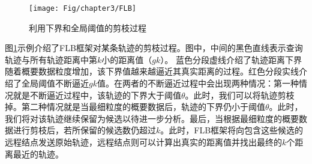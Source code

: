 \begin{figure}
	\centering
	\texttt{[image: Fig/chapter3/FLB]}
	\caption{利用下界和全局阈值的剪枝过程}
	\label{fig-chapter3-FLB}
\end{figure}

图\ref{fig-chapter3-FLB}示例介绍了FLB框架对某条轨迹的剪枝过程。图中，中间的黑色直线表示查询轨迹与所有轨迹距离中第$k$小的距离值（$gk$）。
蓝色分段虚线介绍了轨迹距离下界随着概要数据粒度增加，该下界值越来越逼近其真实距离的过程。红色分段实线介绍了全局阈值不断逼近$gk$值。在两者的不断逼近过程中会出现两种情况：第一种情况就是不断逼近过程中，该轨迹的下界大于阈值$\theta$。此时，我们可以将轨迹剪枝掉。第二种情况就是当最细粒度的概要数据后，轨迹的下界仍小于阈值$\theta$。此时，我们将对该轨迹继续保留为候选以待进一步分析。最后，当根据最细粒度的概要数据进行剪枝后，若所保留的候选数仍超过$k$。此时，FLB框架将向包含这些候选的远程结点发送原始轨迹，远程结点则可以计算出真实的距离值并找出最终的$k$个距离最近的轨迹。

